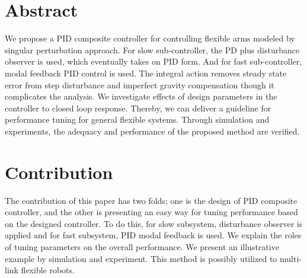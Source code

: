 {\section*{\centering \bf Abstract}
We propose a PID composite controller for controlling
flexible arms modeled by singular perturbation approach. For slow
sub-controller, the PD plus disturbance observer is used, which
eventually takes on PID form. And for fast sub-controller, modal
feedback PID control is used. The integral action removes steady
state error from step disturbance and imperfect gravity
compensation though it complicates the analysis. We investigate
effects of design parameters in the controller to closed loop
response. Thereby, we can deliver a guideline for performance
tuning for general flexible systems. Through simulation and
experiments, the adequacy and performance of the proposed method
are verified.
%
\section*{\centering \bf Contribution}
The contribution of this paper has two folds; one is the
design of PID composite controller, and
the other is presenting an easy way for tuning performance
based on the designed controller.
To do this, for slow subsystem, disturbance observer is applied and
for fast subsystem, PID modal feedback is used.
We explain the roles of tuning parameters on the
overall performance. We present an illustrative
example by simulation and experiment.
This method is possibly utilized to multi-link flexible robots.

}
